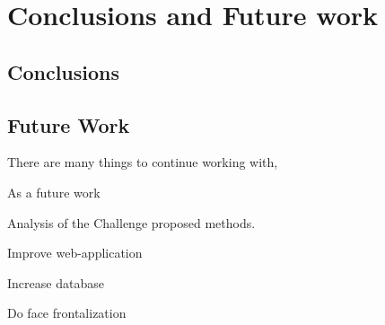 \chapter{Conclusions and Future work} \label{chap:conclusions}

\section{Conclusions}


\section{Future Work}

There are many things to continue working with, 


As a future work 

Analysis of the Challenge proposed methods.

Improve web-application

Increase database

Do face frontalization